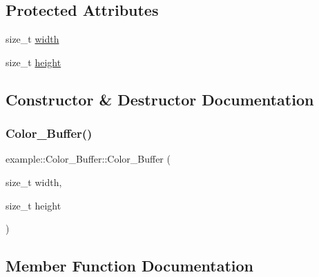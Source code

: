 \subsection*{Protected Attributes}
\begin{DoxyCompactItemize}
\item 
size\+\_\+t \mbox{\hyperlink{classexample_1_1_color___buffer_ab61454d4b35cbba00d2e634d14ed20ac}{width}}
\item 
size\+\_\+t \mbox{\hyperlink{classexample_1_1_color___buffer_ae01f4538ee30af1d3072a425c5ad37ac}{height}}
\end{DoxyCompactItemize}


\subsection{Constructor \& Destructor Documentation}
\mbox{\label{classexample_1_1_color___buffer_a44c19770a14b0f8e46e7ceda1df5fc3d}} 
\subsubsection{\texorpdfstring{Color\+\_\+\+Buffer()}{Color\_Buffer()}}
{\footnotesize\ttfamily example\+::\+Color\+\_\+\+Buffer\+::\+Color\+\_\+\+Buffer (\begin{DoxyParamCaption}\item[{size\+\_\+t}]{width,  }\item[{size\+\_\+t}]{height }\end{DoxyParamCaption})\hspace{0.3cm}{\ttfamily [inline]}}



\subsection{Member Function Documentation}
\mbox{\label{classexample_1_1_color___buffer_a76463553dc782f2dc24a61bec708e273}} 
